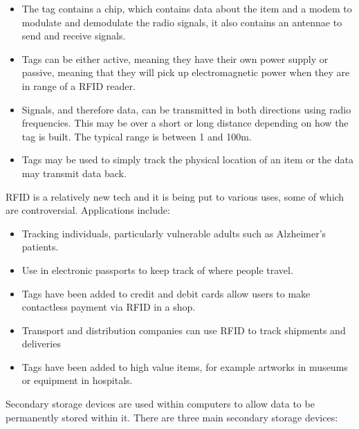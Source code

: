 \begin{itemize}
      \begin{itemize}
        \setlength{\itemsep}{0em}
        \item The tag contains a chip, which contains data about the item and a modem to modulate and demodulate the radio signals, it also contains an antennae to send and receive signals.
        \item Tags can be either active, meaning they have their own power supply or passive, meaning that they will pick up electromagnetic power when they are in range of a RFID reader.
        \item Signals, and therefore data, can be transmitted in both directions using radio frequencies. This may be over a short or long distance depending on how the tag is built. The typical range is between 1 and 100m.
        \item Tags may be used to simply track the physical location of an item or the data may transmit data back.
      \end{itemize}
      \subitem RFID is a relatively new tech and it is being put to various uses, some of which are controversial. Applications include:
      \begin{itemize}
        \item Tracking individuals, particularly vulnerable adults such as Alzheimer's patients.
        \item Use in electronic passports to keep track of where people travel.
        \item Tags have been added to credit and debit cards allow users to make contactless payment via RFID in a shop.
        \item Transport and distribution companies can use RFID to track shipments and deliveries
        \item Tags have been added to high value items, for example artworks in museums or equipment in hospitals.
      \end{itemize}
  \end{itemize}
  Secondary storage devices are used within computers to allow data to be permanently stored within it. There are three main secondary storage devices:
